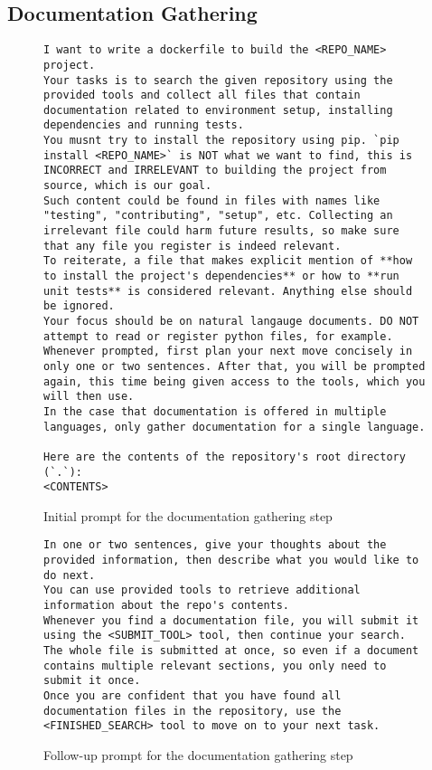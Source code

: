\documentclass[conference]{IEEEtran}
\begin{document}
\subsection{Documentation Gathering}
\begin{figure}[h!]
    \begin{lstlisting}
I want to write a dockerfile to build the <REPO_NAME> project.
Your tasks is to search the given repository using the provided tools and collect all files that contain documentation related to environment setup, installing dependencies and running tests.
You musnt try to install the repository using pip. `pip install <REPO_NAME>` is NOT what we want to find, this is INCORRECT and IRRELEVANT to building the project from source, which is our goal.
Such content could be found in files with names like "testing", "contributing", "setup", etc. Collecting an irrelevant file could harm future results, so make sure that any file you register is indeed relevant.
To reiterate, a file that makes explicit mention of **how to install the project's dependencies** or how to **run unit tests** is considered relevant. Anything else should be ignored.
Your focus should be on natural langauge documents. DO NOT attempt to read or register python files, for example.
Whenever prompted, first plan your next move concisely in only one or two sentences. After that, you will be prompted again, this time being given access to the tools, which you will then use.
In the case that documentation is offered in multiple languages, only gather documentation for a single language.

Here are the contents of the repository's root directory (`.`):
<CONTENTS>
    \end{lstlisting}
    \caption{Initial prompt for the documentation gathering step}
\end{figure}
\begin{figure}[h!]
    \begin{lstlisting}
In one or two sentences, give your thoughts about the provided information, then describe what you would like to do next.
You can use provided tools to retrieve additional information about the repo's contents.
Whenever you find a documentation file, you will submit it using the <SUBMIT_TOOL> tool, then continue your search. The whole file is submitted at once, so even if a document contains multiple relevant sections, you only need to submit it once.
Once you are confident that you have found all documentation files in the repository, use the <FINISHED_SEARCH> tool to move on to your next task.
    \end{lstlisting}
    \caption{Follow-up prompt for the documentation gathering step}
\end{figure}
\end{document}
